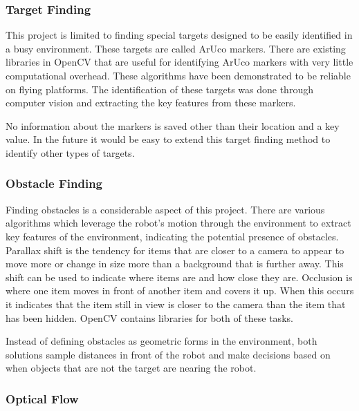 \documentclass{article}[12]
\begin{document}
		\subsubsection{Target Finding}
		
		This project is limited to finding special targets designed to be easily identified in a busy environment. These targets are called ArUco markers. There are existing libraries in OpenCV that are useful for identifying ArUco markers with very little computational overhead. These algorithms have been demonstrated to be reliable on flying platforms. \cite{bacik2017autonomous} The identification of these targets was done through computer vision and extracting the key features from these markers. 
		
		No information about the markers is saved other than their location and a key value. In the future it would be easy to extend this target finding method to identify other types of targets.
		
		\subsubsection{Obstacle Finding}
		
		Finding obstacles is a considerable aspect of this project. There are various algorithms which leverage the robot's motion through the environment to extract key features of the environment, indicating the potential presence of obstacles. Parallax shift is the tendency for items that are closer to a camera to appear to move more or change in size more than a background that is further away. This shift can be used to indicate where items are and how close they are. Occlusion is where one item moves in front of another item and covers it up. When this occurs it indicates that the item still in view is closer to the camera than the item that has been hidden. OpenCV contains libraries for both of these tasks.
		
		Instead of defining obstacles as geometric forms in the environment, both solutions sample distances in front of the robot and make decisions based on when objects that are not the target are nearing the robot.
		
		\subsubsection{Optical Flow}
		
\end{document}
